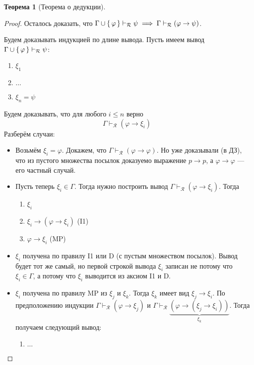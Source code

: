 \documentclass[12pt]{article}
\let\im\rightarrow
\let\un\cup
\theoremstyle{definition}
\newtheorem{theorem}{Теорема}[section]
\theoremstyle{statement}
\theoremstyle{theorem}
\begin{document}
\begin{theorem}[Теорема о дедукции]
\begin{proof}
    Осталось доказать, что $\Gamma \un \set{\varphi}
    \vdash_{\mathcal{R}} \psi \implies \Gamma \vdash_{\mathcal{R}}
    (\varphi \im \psi)$.

    Будем доказывать индукцией по длине вывода. Пусть имеем вывод
    $\Gamma \un \set{\varphi} \vdash_{\mathcal{R}} \psi$:
    \begin{enumerate}
      \item $\xi_1$

      \item $\dots$

      \item $\xi_n = \psi$
    \end{enumerate}
    Будем доказывать, что для любого $i \leqslant n$ верно
    \[
      \Gamma \vdash_{\mathcal{R}} (\varphi \im \xi_i)
    \]
    Разберём случаи:
    \begin{itemize}
      \item Возьмём $\xi_i = \varphi$. Докажем, что $\Gamma
        \vdash_{\mathcal{R}} (\varphi \im \varphi)$. Но уже
        доказывали (в ДЗ), что из пустого множества посылок доказуемо
        выражение $p \im p$, а $\varphi \im \varphi$ --- его частный случай.

      \item Пусть теперь $\xi_i \in \Gamma$. Тогда нужно построить
        вывод $\Gamma \vdash_{\mathcal{R}} (\varphi \im \xi_i)$. Тогда
        \begin{enumerate}
          \item $\xi_i$

          \item $\xi_i \im (\varphi \im \xi_i)$ (I1)

          \item $\varphi \im \xi_i$ (MP)
        \end{enumerate}

      \item $\xi_i$ получена по правилу I1 или D (с пустым
        множеством посылок). Вывод будет тот же самый, но первой
        строкой вывода $\xi_i$ записан не потому что $\xi_i \in
        \Gamma$, а потому что $\xi_i$ выводится из аксиом I1 и D.

      \item $\xi_i$ получена по правилу MP из $\xi_j$ и $\xi_k$.
        Тогда $\xi_k$ имеет вид $\xi_j \im \xi_i$. По предположению
        индукции $\Gamma \vdash_{\mathcal{R}} (\varphi \im \xi_j)$ и
        $\Gamma \vdash_{\mathcal{R}} \underbrace{(\varphi \im (\xi_j
        \im \xi_i))}_{\xi_k}$. Тогда получаем следующий вывод:
        \begin{enumerate}
          \item $\dots$


\end{enumerate}
\end{itemize}
\end{proof}
\end{theorem}
\end{document}
